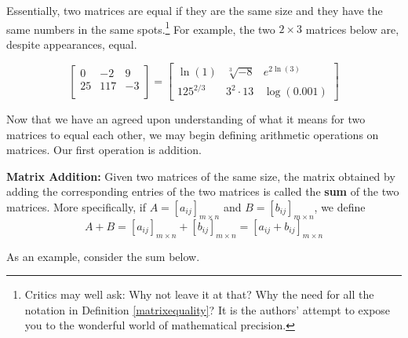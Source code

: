 \smallskip

Essentially, two matrices are equal if they are the same size and they have the same numbers in the same spots.\footnote{Critics may well ask: Why not leave it at that?  Why the need for all the notation in Definition \ref{matrixequality}?  It is the authors' attempt to expose you to the wonderful world of mathematical precision.} For example, the two $2 \times 3$ matrices below are, despite appearances, equal.

\[ \left[ \begin{array}{rrr} 0 & -2 & 9 \\ 25 & 117 & -3 \\ \end{array} \right] =  \left[ \begin{array}{rrr} \ln(1) & \sqrt[3]{-8} & e^{2\ln(3)} \\ 125^{2/3} &  3^{2} \cdot 13 & \log(0.001)  \end{array} \right]\]

Now that we have an agreed upon understanding of what it means for two matrices to equal each other, we may begin defining arithmetic operations on matrices.  Our first operation is addition.
\smallskip

\colorbox{ResultColor}{\bbm

\begin{defn} \label{matrixaddition}  \textbf{Matrix Addition:}  Given two matrices of the same size, the matrix obtained by adding the corresponding entries of the two matrices is called the  \textbf{sum} of the two matrices. More specifically,  if $A =\left[a_{ij}\right]_{m \times n}$ and $B =\left[b_{ij}\right]_{m \times n}$, we define \[A + B = \left[a_{ij}\right]_{m \times n} + \left[b_{ij}\right]_{m \times n} = \left[ a_{ij} + b_{ij} \right]_{m \times n}\] 

\end{defn}

\ebm}

\smallskip

As an example, consider the sum below.

